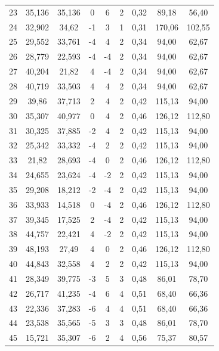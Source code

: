 \begin{table}
\begin{tabular}{ccccccccc}
23 & 35,136 & 35,136 & 0 & 6 & 2 & 0,32 & 89,18 & 56,40\\
24 & 32,902 & 34,62 & -1 & 3 & 1 & 0,31 & 170,06 & 102,55\\
25 & 29,552 & 33,761 & -4 & 4 & 2 & 0,34 & 94,00 & 62,67\\
26 & 28,779 & 22,593 & -4 & -4 & 2 & 0,34 & 94,00 & 62,67\\
27 & 40,204 & 21,82 & 4 & -4 & 2 & 0,34 & 94,00 & 62,67\\
28 & 40,719 & 33,503 & 4 & 4 & 2 & 0,34 & 94,00 & 62,67\\
29 & 39,86 & 37,713 & 2 & 4 & 2 & 0,42 & 115,13 & 94,00\\
30 & 35,307 & 40,977 & 0 & 4 & 2 & 0,46 & 126,12 & 112,80\\
31 & 30,325 & 37,885 & -2 & 4 & 2 & 0,42 & 115,13 & 94,00\\
32 & 25,342 & 33,332 & -4 & 2 & 2 & 0,42 & 115,13 & 94,00\\
33 & 21,82 & 28,693 & -4 & 0 & 2 & 0,46 & 126,12 & 112,80\\
34 & 24,655 & 23,624 & -4 & -2 & 2 & 0,42 & 115,13 & 94,00\\
35 & 29,208 & 18,212 & -2 & -4 & 2 & 0,42 & 115,13 & 94,00\\
36 & 33,933 & 14,518 & 0 & -4 & 2 & 0,46 & 126,12 & 112,80\\
37 & 39,345 & 17,525 & 2 & -4 & 2 & 0,42 & 115,13 & 94,00\\
38 & 44,757 & 22,421 & 4 & -2 & 2 & 0,42 & 115,13 & 94,00\\
39 & 48,193 & 27,49 & 4 & 0 & 2 & 0,46 & 126,12 & 112,80\\
40 & 44,843 & 32,558 & 4 & 2 & 2 & 0,42 & 115,13 & 94,00\\
41 & 28,349 & 39,775 & -3 & 5 & 3 & 0,48 & 86,01 & 78,70\\
42 & 26,717 & 41,235 & -4 & 6 & 4 & 0,51 & 68,40 & 66,36\\
43 & 22,336 & 37,283 & -6 & 4 & 4 & 0,51 & 68,40 & 66,36\\
44 & 23,538 & 35,565 & -5 & 3 & 3 & 0,48 & 86,01 & 78,70\\
45 & 15,721 & 35,307 & -6 & 2 & 4 & 0,56 & 75,37 & 80,57\\
\bottomrule
\end{tabular}
\end{table}
